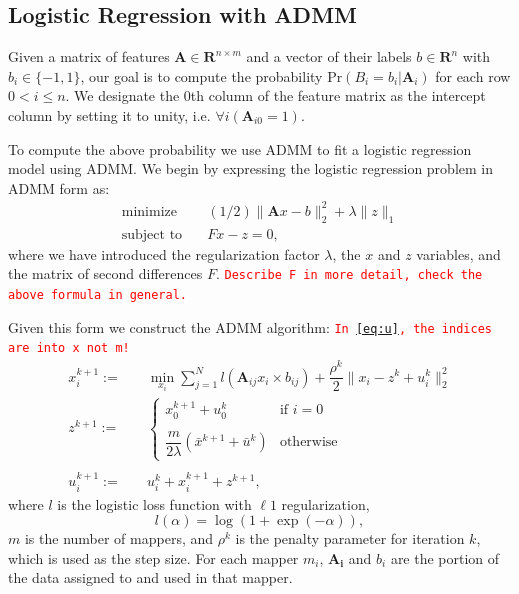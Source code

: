 \documentclass[10pt, conference, compsocconf]{IEEEtran}
\newcommand{\todo}[1]{\texttt{\textcolor{red}{#1}}}
\begin{document}
\subsection{Logistic Regression with ADMM}
Given a matrix of features $\mathbf{A}\in\mathbf{R}^{n\times m}$ and a vector of their labels $b\in\mathbf{R}^n$ with $b_i\in\{-1,1\}$, our goal is to compute the probability $\text{Pr}(B_i=b_i|\mathbf{A}_i)$ for each row $0<i\leq n$.  We designate the 0th column of the feature matrix as the intercept column by setting it to unity, i.e. $\forall i(\mathbf{A}_{i0}=1)$.

To compute the above probability we use ADMM to fit a logistic regression model using ADMM.  We begin by expressing the logistic regression problem in ADMM form as:
\begin{align*}
\text{minimize}&\quad (1/2)\|\mathbf{A}x-b\|_2^2+\lambda\|z\|_1\\
\text{subject to}&\quad Fx-z=0,
\end{align*}
where we have introduced the regularization factor $\lambda$, the $x$ and $z$ variables, and the matrix of second differences $F$. \todo{Describe F in more detail, check the above formula in general.}

Given this form we construct the ADMM algorithm:
\todo{In \ref{eq:u}, the indices are into x not m!}\\
\begin{align}
\label{eq:x}
x_i^{k+1} :=&\quad \min_{x_i} \sum_{j=1}^Nl(\mathbf{A}_{ij}x_i\times b_{ij}) + \dfrac{\rho^k}{2}\|x_i - z^k + u_i^k\|_2^2\\
\label{eq:z}
z^{k+1} :=&\quad \begin{cases}
    x_0^{k+1} + u_0^k& \text{if $i=0$}\\
    \\
    \dfrac{m}{2\lambda}(\bar{x}^{k+1} + \bar{u}^k)& \text{otherwise}
  \end{cases}\\
\nonumber\\
\label{eq:u}
u_i^{k+1} :=&\quad u_i^k + x_i^{k+1} + z^{k+1},
\end{align}
where $l$ is the logistic loss function with $\ell1$ regularization,
\begin{equation*}
l(\alpha)=\log(1+\exp(-\alpha)),
\end{equation*}
$m$ is the number of mappers, and $\rho^k$ is the penalty parameter for iteration $k$, which is used as the step size. For each mapper $m_i$, $\mathbf{A_i}$ and $b_i$ are the portion of the data assigned to and used in that mapper.
\end{document}
